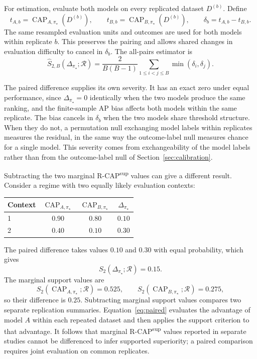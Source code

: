 \documentclass[11pt]{article}
\newcommand{\CAP}{\operatorname{CAP}}
\newcommand{\Regime}{\mathcal{R}}
\theoremstyle{remark}
\begin{document}
For estimation, evaluate both models on every replicated dataset $D^{(b)}$. Define
\[
t_{A,b}=\CAP_{A,\pi_\star}(D^{(b)}),
\qquad
t_{B,b}=\CAP_{B,\pi_\star}(D^{(b)}),
\qquad
\delta_b=t_{A,b}-t_{B,b}.
\]
The same resampled evaluation units and outcomes are used for both models within replicate $b$. This preserves the pairing and allows shared changes in evaluation difficulty to cancel in $\delta_b$. The all-pairs estimator is
\begin{equation}
\widehat S_{2,B}(\Delta_{\pi_\star};\Regime)
=
\frac{2}{B(B-1)}
\sum_{1\leq i<j\leq B}
\min(\delta_i,\delta_j).
\label{eq:paired-estimator}
\end{equation}

The paired difference supplies its own severity. It has an exact zero under equal performance, since $\Delta_{\pi_\star}=0$ identically when the two models produce the same ranking, and the finite-sample AP bias affects both models within the same replicate. The bias cancels in $\delta_b$ when the two models share threshold structure. When they do not, a permutation null exchanging model labels within replicates measures the residual, in the same way the outcome-label null measures chance for a single model. This severity comes from exchangeability of the model labels rather than from the outcome-label null of Section~\ref{sec:calibration}.

Subtracting the two marginal R-CAP\textsuperscript{sup} values can give a different result. Consider a regime with two equally likely evaluation contexts:
\begin{center}
\begin{tabular}{@{}lccc@{}}
\toprule
Context & $\CAP_{A,\pi_\star}$ & $\CAP_{B,\pi_\star}$ & $\Delta_{\pi_\star}$ \\
\midrule
1 & $0.90$ & $0.80$ & $0.10$ \\
2 & $0.40$ & $0.10$ & $0.30$ \\
\bottomrule
\end{tabular}
\end{center}
The paired difference takes values $0.10$ and $0.30$ with equal probability, which gives
\[
S_2(\Delta_{\pi_\star};\Regime)=0.15.
\]
The marginal support values are
\[
S_2(\CAP_{A,\pi_\star};\Regime)=0.525,
\qquad
S_2(\CAP_{B,\pi_\star};\Regime)=0.275,
\]
so their difference is $0.25$. Subtracting marginal support values compares two separate replication summaries. Equation~\eqref{eq:paired} evaluates the advantage of model $A$ within each repeated dataset and then applies the support criterion to that advantage. It follows that marginal R-CAP\textsuperscript{sup} values reported in separate studies cannot be differenced to infer supported superiority; a paired comparison requires joint evaluation on common replicates.
\end{document}
